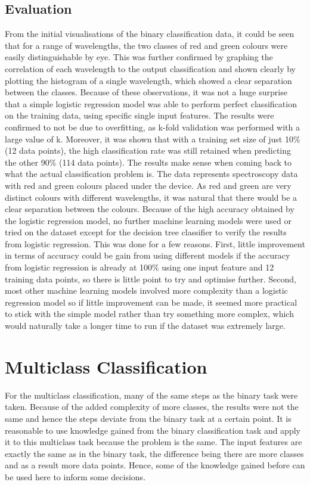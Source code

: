 \documentclass{article}
\begin{document}
\subsection{Evaluation}
From the initial visualisations of the binary classification data, it could be seen that for a range of wavelengths, the two classes of red and green colours were easily distinguishable by eye. This was further confirmed by graphing the correlation of each wavelength to the output classification and shown clearly by plotting the histogram of a single wavelength, which showed a clear separation between the classes. Because of these observations, it was not a huge surprise that a simple logistic regression model was able to perform perfect classification on the training data, using specific single input features. The results were confirmed to not be due to overfitting, as k-fold validation was performed with a large value of k. Moreover, it was shown that with a training set size of just 10\% (12 data points), the high classification rate was still retained when predicting the other 90\% (114 data points).
\n
The results make sense when coming back to what the actual classification problem is. The data represents spectroscopy data with red and green colours placed under the device. As red and green are very distinct colours with different wavelengths, it was natural that there would be a clear separation between the colours.
\n
Because of the high accuracy obtained by the logistic regression model, no further machine learning models were used or tried on the dataset except for the decision tree classifier to verify the results from logistic regression. This was done for a few reasons. First, little improvement in terms of accuracy could be gain from using different models if the accuracy from logistic regression is already at 100\% using one input feature and 12 training data points, so there is little point to try and optimise further. Second, most other machine learning models involved more complexity than a logistic regression model so if little improvement can be made, it seemed more practical to stick with the simple model rather than try something more complex, which would naturally take a longer time to run if the dataset was extremely large. 

\section{Multiclass Classification}
For the multiclass classification, many of the same steps as the binary task were taken. Because of the added complexity of more classes, the results were not the same and hence the steps deviate from the binary task at a certain point. It is reasonable to use knowledge gained from the binary classification task and apply it to this multiclass task because the problem is the same. The input features are exactly the same as in the binary task, the difference being there are more classes and as a result more data points. Hence, some of the knowledge gained before can be used here to inform some decisions. 
\end{document}
